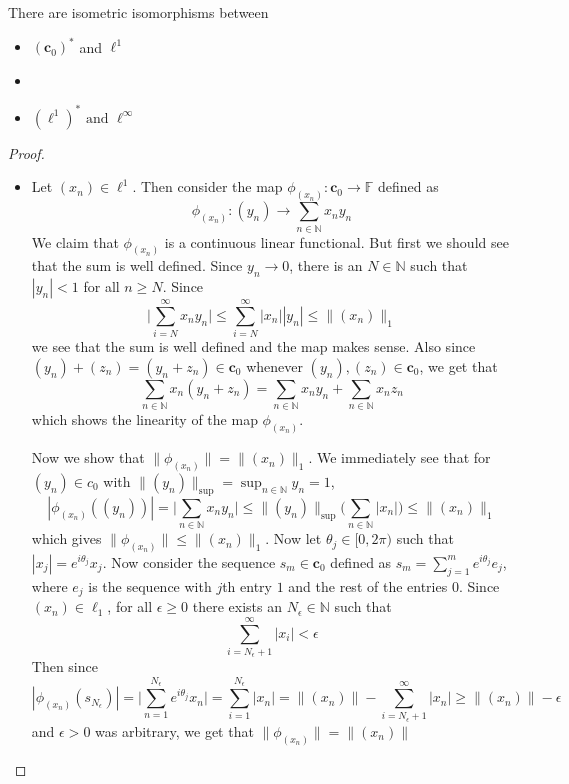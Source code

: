 \begin{theorem}
  There are isometric isomorphisms between
  \begin{itemize}[]
    \item $(\textbf{c}_0)^*$ and $\ell^1$
    \item
    \item $(\ell^1)^{*} \textrm{ and } \ell^\infty$
  \end{itemize}
\end{theorem}
\begin{proof}
  \begin{itemize}[]
    \item Let $(x_{n}) \in \ell^1$. Then consider the map
      $\phi_{(x_n)}: \textbf{c}_0 \to \mathbb{F}$ defined as
      $$\phi_{(x_n)}: (y_n) \to \sum_{n \in \mathbb{N}} x_ny_n$$
      We claim that $\phi_{(x_n)}$ is a continuous linear functional.
      But first we should see that the sum is well defined. Since
      $y_n \to 0$, there is an $N \in \mathbb{N}$ such that $|y_n| <
      1$ for all $n \ge N$. Since \[
        \Big|\sum_{i = N}^{\infty} x_ny_n \Big| \le \sum_{i =
        N}^{\infty}  |x_n||y_n| \le \|(x_n)\|_1
      \]
      we see that the sum is well defined and the map makes sense.
      Also since $(y_n)+(z_n) = (y_n +z_n) \in \textbf{c}_0$ whenever
      $(y_n), (z_n) \in \textbf{c}_0$, we get that \[
        \sum_{n \in \mathbb{N}} x_n (y_n + z_n) = \sum_{n \in
        \mathbb{N}} x_n y_n + \sum_{n \in \mathbb{N}} x_n z_n
      \]
      which shows the linearity  of the map $\phi_{(x_n)}$.

      Now we show that $\|\phi_{(x_n)}\| = \|(x_n)\|_1$. We
      immediately see that for $(y_n) \in c_0$ with
      $\|(y_n)\|_{\textrm{sup}} = \sup_{n \in \mathbb{N}} y_n = 1$, \[
        |\phi_{(x_n)}((y_n))| = \Big|\sum_{n \in \mathbb{N}} x_ny_n
        \Big| \le \|(y_n)\|_{\textrm{sup}} \bigg( \sum_{n \in
        \mathbb{N}} |x_n| \bigg) \le \|(x_n)\|_1
      \]
      which gives $\|\phi_{(x_n)}\| \le \|(x_n)\|_1$. Now let
      $\theta_j \in [0, 2\pi)$ such that $|x_j| = e^{i \theta_j}x_j$.
      Now consider the sequence $s_m \in \textbf{c}_0$ defined as
      $s_m = \sum_{j = 1}^{m} e^{i \theta_j}e_j$, where $e_j$ is  the
      sequence with $j$th entry $1$ and the rest of the entries $0$.
      Since $(x_n) \in \ell_1$, for all $\epsilon \ge 0$ there exists
      an $N_\epsilon \in \mathbb{N}$ such that \[
        \sum_{i = N_\epsilon+1}^{\infty} |x_i| < \epsilon
      \]
      Then since \[
        |\phi_{(x_n)}(s_{N_\epsilon})| = \Big| \sum_{n =
        1}^{N_\epsilon} e^{i \theta_j}x_n \Big| = \sum_{i =
        1}^{N_\epsilon} |x_n| = \|(x_n)\| - \sum_{i = N_\epsilon
        +1}^{\infty} |x_n| \ge \|(x_n)\| - \epsilon
      \]
      and $\epsilon > 0$ was arbitrary, we get that $\|\phi_{(x_n)}\|
      = \|(x_{n})\|$


\end{itemize}
\end{proof}

